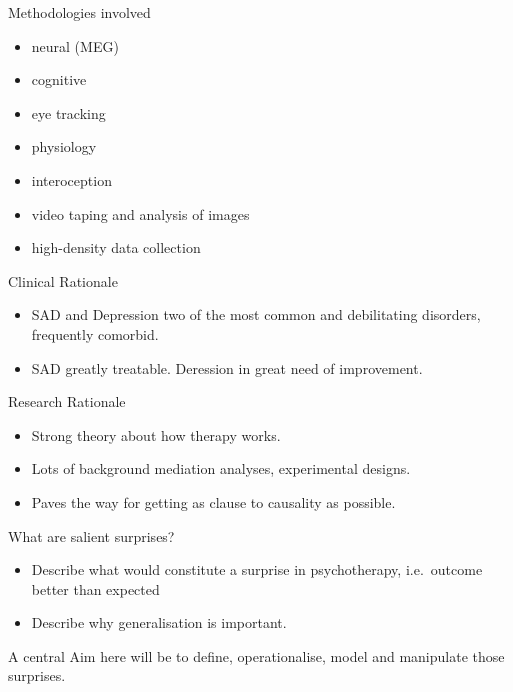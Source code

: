 \documentclass[
  ignorenonframetext,
]{beamer}
\providecommand{\tightlist}{%
  \setlength{\itemsep}{0pt}\setlength{\parskip}{0pt}}
\begin{document}
\begin{frame}{Methodologies involved}
\protect\hypertarget{methodologies-involved}{}

\begin{itemize}
\tightlist
\item
  neural (MEG)
\item
  cognitive
\item
  eye tracking
\item
  physiology
\item
  interoception
\item
  video taping and analysis of images
\item
  high-density data collection
\end{itemize}

\end{frame}

\begin{frame}{Clinical Rationale}
\protect\hypertarget{clinical-rationale}{}

\begin{itemize}
\tightlist
\item
  SAD and Depression two of the most common and debilitating disorders,
  frequently comorbid.
\item
  SAD greatly treatable. Deression in great need of improvement.
\end{itemize}

\end{frame}

\begin{frame}{Research Rationale}
\protect\hypertarget{research-rationale}{}

\begin{itemize}
\tightlist
\item
  Strong theory about how therapy works.
\item
  Lots of background mediation analyses, experimental designs.
\item
  Paves the way for getting as clause to causality as possible.
\end{itemize}

\end{frame}

\begin{frame}{What are salient surprises?}
\protect\hypertarget{what-are-salient-surprises}{}

\begin{itemize}
\item
  Describe what would constitute a surprise in psychotherapy,
  i.e.~outcome better than expected
\item
  Describe why generalisation is important.
\end{itemize}

A central Aim here will be to define, operationalise, model and
manipulate those surprises.

\end{frame}
\end{document}
